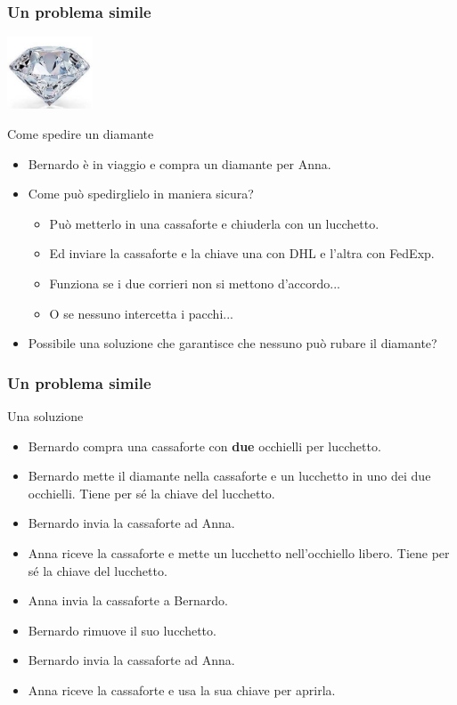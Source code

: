 \documentclass[]{beamer}
\begin{document}
\begin{frame}
\frametitle{Un problema simile}


\hfill\includegraphics[width=1in]{Images/diamante/koohinoor.jpg}
\begin{block}{Come spedire un diamante}
\pause
\begin{itemize}
\color{blue}
\item <+-> Bernardo \`e in viaggio e compra un diamante per Anna.
\item <+-> Come pu\`o spedirglielo in maniera sicura?
\begin{itemize}
\color{teal}
\item <+-> Pu\`o metterlo in una cassaforte e chiuderla con un lucchetto.
\item <+-> Ed inviare la cassaforte e la chiave una con DHL e l'altra con
FedExp.
\item <+-> Funziona se i due corrieri non si mettono d'accordo...
\item <+-> O se nessuno intercetta i pacchi...
\end{itemize}
\item <+-> Possibile una soluzione che garantisce che nessuno pu\`o 
rubare il diamante?
\end{itemize}
\end{block}
\end{frame}

\begin{frame}
\frametitle{Un problema simile}
\begin{block}{Una soluzione}
\pause
\begin{itemize}
\color{blue}
\item <+-> Bernardo compra una cassaforte con {\color{red}\bf due} occhielli per lucchetto.
\item <+-> Bernardo mette il diamante nella cassaforte e un lucchetto in uno dei due occhielli. Tiene per s\'e la chiave del lucchetto.
\item <+-> Bernardo invia la cassaforte ad Anna.
\item <+-> Anna riceve la cassaforte e mette un lucchetto nell'occhiello libero.
Tiene per s\'e la chiave del lucchetto.
\item <+-> Anna invia la cassaforte a Bernardo.
\item <+-> Bernardo rimuove il suo lucchetto.
\item <+-> Bernardo invia la cassaforte ad Anna.
\item <+-> Anna riceve la cassaforte e usa la sua chiave per aprirla.
\end{itemize}
\end{block}
\end{frame}
\end{document}
